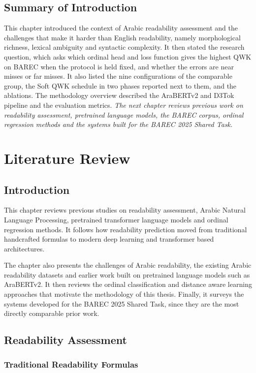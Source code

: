 \documentclass[12pt]{report}
\begin{document}
\section{Summary of Introduction}
This chapter introduced the context of Arabic readability assessment and the challenges that make it harder than English readability, namely morphological richness, lexical ambiguity and syntactic complexity. It then stated the research question, which asks which ordinal head and loss function gives the highest QWK on BAREC when the protocol is held fixed, and whether the errors are near misses or far misses. It also listed the nine configurations of the comparable group, the Soft QWK schedule in two phases reported next to them, and the ablations. The methodology overview described the AraBERTv2 and D3Tok pipeline and the evaluation metrics.
\textit{The next chapter reviews previous work on readability assessment, pretrained language models, the BAREC corpus, ordinal regression methods and the systems built for the BAREC 2025 Shared Task.}
\chapter{Literature Review}
\label{chap:relatedwork}
\section{Introduction}

This chapter reviews previous studies on readability assessment, Arabic Natural Language Processing, pretrained transformer language models and ordinal regression methods. It follows how readability prediction moved from traditional handcrafted formulas to modern deep learning and transformer based architectures.

The chapter also presents the challenges of Arabic readability, the existing Arabic readability datasets and earlier work built on pretrained language models such as AraBERTv2. It then reviews the ordinal classification and distance aware learning approaches that motivate the methodology of this thesis. Finally, it surveys the systems developed for the BAREC 2025 Shared Task, since they are the most directly comparable prior work.

\section{Readability Assessment}

\subsection{Traditional Readability Formulas}
\end{document}
